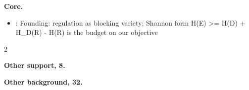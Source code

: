 \documentclass[10pt]{article}
\newcommand{\memb}[1]{\par\smallskip\textbf{#1}\quad}
\begin{document}
\memb{Core.}
\begin{itemize}[nosep,leftmargin=1.2em]
\item \citet{Ashby-introduction56}: Founding: regulation as blocking variety; Shannon form H(E) \textgreater{}= H(D) + H\_D(R) - H(R) is the budget on our objective
\end{itemize}
\begin{multicols}{2}
\memb{Other support, 8.} \citetext{\citealp{Sommerhoff-analytical50}\dag; \citealp{Powers-general60}; \citealp{Powers-behavior73}\dag; \citealp{Powers-feedback73}; \citealp{Powers-quantitative78}; \citealp{Gulrez-high21}; \citealp{Farrell-perceptual23}\dag; \citealp{Kennaway-perceptual25}\dag}

\memb{Other background, 32.} {\footnotesize \citetext{\citealp{Craik-nature43}; \citealp{Schrodinger-what44}; \citealp{Ashby-principles47}; \citealp{Wiener-cybernetics61}; \citealp{Kickert-some78}; \citealp{Ashby-principles91}; \citealp{Schneider-life94}; \citealp{Dent-origins99}; \citealp{Webb-can01}; \citealp{Klir-role02}; \citealp{Heylighen-cybernetics03}; \citealp{Husbands-ratio08}; \citealp{Umpleby-ross08}; \citealp{Asaro-information09}; \citealp{Klir-ashby09}; \citealp{Krippendorff-ross09}; \citealp{Nechansky-elements10}; \citealp{Rosen-anticipatory12}; \citealp{Goldstein-homeostatic17}; \citealp{Cziko-perceptual92}; \citealp{Marken-you09}; \citealp{Mansell-control11}; \citealp{Marken-perceptual13}; \citealp{Mansell-origins15}; \citealp{Moore-pct16}; \citealp{Pezzulo-navigating16}; \citealp{Young-general17}; \citealp{Arsiwalla-beyond19}; \citealp{Mansell-interdisciplinary20}; \citealp{Eder-perceptual23}; \citealp{Moore-local23}; \citealp{Roachford-pct25}}}

\end{multicols}
\end{document}
